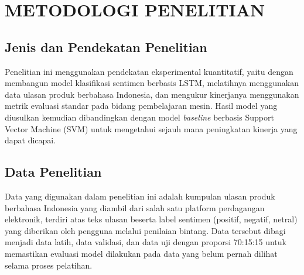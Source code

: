 
\chapter{METODOLOGI PENELITIAN}

\section{Jenis dan Pendekatan Penelitian}
Penelitian ini menggunakan pendekatan eksperimental kuantitatif, yaitu
dengan membangun model klasifikasi sentimen berbasis LSTM,
melatihnya menggunakan data ulasan produk berbahasa Indonesia, dan
mengukur kinerjanya menggunakan metrik evaluasi standar pada bidang
pembelajaran mesin. Hasil model yang diusulkan kemudian dibandingkan
dengan model \textit{baseline} berbasis Support Vector Machine (SVM)
untuk mengetahui sejauh mana peningkatan kinerja yang dapat dicapai.

\section{Data Penelitian}
Data yang digunakan dalam penelitian ini adalah kumpulan ulasan
produk berbahasa Indonesia yang diambil dari salah satu platform
perdagangan elektronik, terdiri atas teks ulasan beserta label
sentimen (positif, negatif, netral) yang diberikan oleh pengguna
melalui penilaian bintang. Data tersebut dibagi menjadi data latih,
data validasi, dan data uji dengan proporsi 70:15:15 untuk memastikan
evaluasi model dilakukan pada data yang belum pernah dilihat selama
proses pelatihan.

